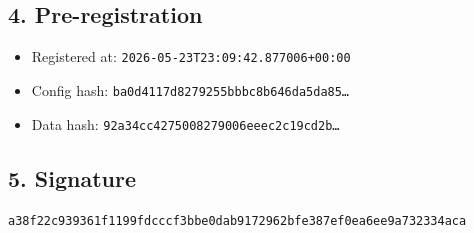 \documentclass{article}
\begin{document}
\subsection*{4. Pre-registration}
\begin{itemize}
\item Registered at: \texttt{2026-05-23T23:09:42.877006+00:00}
\item Config hash: \texttt{ba0d4117d8279255bbbc8b646da5da85\dots}
\item Data hash: \texttt{92a34cc4275008279006eeec2c19cd2b\dots}
\end{itemize}
\subsection*{5. Signature}
\texttt{a38f22c939361f1199fdcccf3bbe0dab9172962bfe387ef0ea6ee9a732334aca}\\
\end{document}
